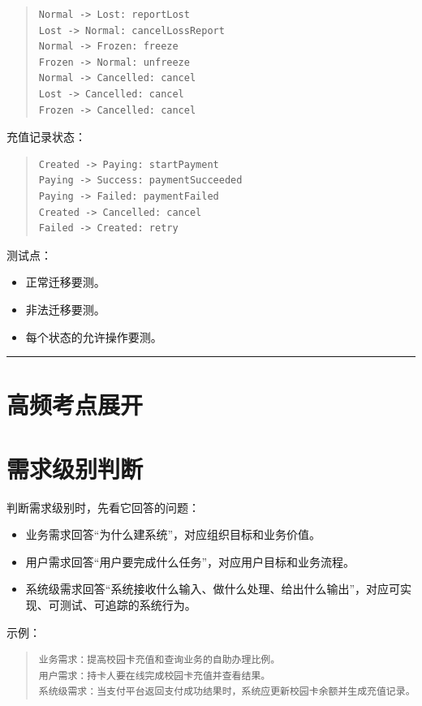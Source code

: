 \documentclass[UTF8,zihao=-4]{ctexart}
\begin{document}
\begin{quote}
\footnotesize
\begin{verbatim}
Normal -> Lost: reportLost
Lost -> Normal: cancelLossReport
Normal -> Frozen: freeze
Frozen -> Normal: unfreeze
Normal -> Cancelled: cancel
Lost -> Cancelled: cancel
Frozen -> Cancelled: cancel
\end{verbatim}
\end{quote}

充值记录状态：

\begin{quote}
\footnotesize
\begin{verbatim}
Created -> Paying: startPayment
Paying -> Success: paymentSucceeded
Paying -> Failed: paymentFailed
Created -> Cancelled: cancel
Failed -> Created: retry
\end{verbatim}
\end{quote}

测试点：

\begin{itemize}
\item 正常迁移要测。
\item 非法迁移要测。
\item 每个状态的允许操作要测。
\end{itemize}

\bigskip\hrule\bigskip

\section{高频考点展开}

\section{需求级别判断}

判断需求级别时，先看它回答的问题：

\begin{itemize}
\item 业务需求回答“为什么建系统”，对应组织目标和业务价值。
\item 用户需求回答“用户要完成什么任务”，对应用户目标和业务流程。
\item 系统级需求回答“系统接收什么输入、做什么处理、给出什么输出”，对应可实现、可测试、可追踪的系统行为。
\end{itemize}

示例：

\begin{quote}
\footnotesize
\begin{verbatim}
业务需求：提高校园卡充值和查询业务的自助办理比例。
用户需求：持卡人要在线完成校园卡充值并查看结果。
系统级需求：当支付平台返回支付成功结果时，系统应更新校园卡余额并生成充值记录。
\end{verbatim}
\end{quote}
\end{document}
